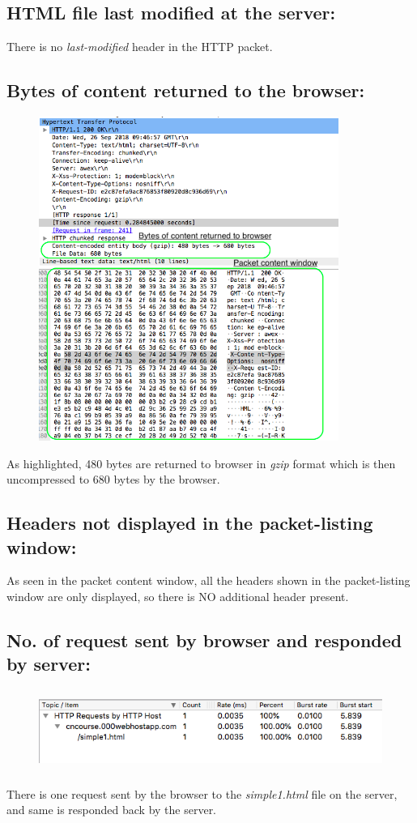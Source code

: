\documentclass[]{report}
\begin{document}
\subsection{HTML file last modified at the server:}
There is no \textit{last-modified} header in the HTTP packet. 
\subsection{Bytes of content returned to the browser:}
\begin{figure}[H]
  	\vspace{0pt}
  	\includegraphics[height = 300pt, keepaspectratio]{Snapshots/q1/simple1/1_7.png}
\end{figure}
As highlighted, 480 bytes are returned to browser in \textit{gzip} format which is then uncompressed to 680 bytes by the browser.
\subsection{Headers not displayed in the packet-listing window:}
As seen in the packet content window, all the headers shown in the packet-listing window are only displayed, so there is NO additional header present.
\subsection{No. of request sent by browser and responded by server:}
\begin{figure}[H]
	\vspace{0pt}
	\includegraphics[height = 75pt, keepaspectratio]{Snapshots/q1/simple1/1_8.png}
\end{figure}
There is one request sent by the browser to the \textit{simple1.html} file on the server, and same is responded back by the server. 
\end{document}
